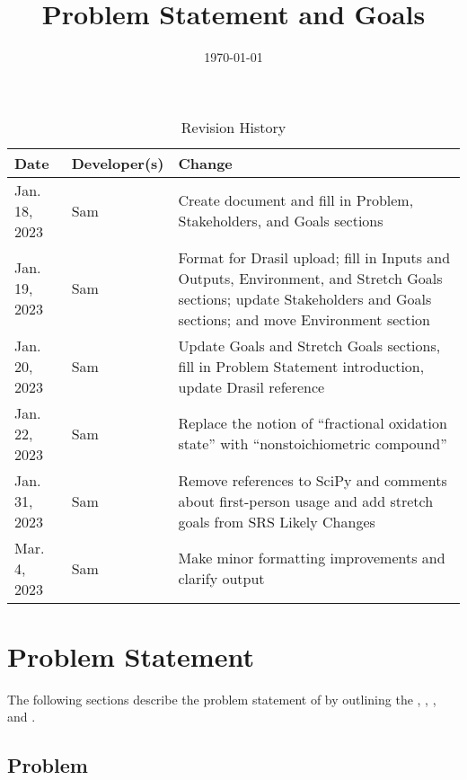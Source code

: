 \documentclass{article}
\title{Problem Statement and Goals\\\progname}
\author{\authname}
\date{\today}
\begin{document}
\maketitle

\begin{table}[hp]
	\caption{Revision History} \label{TblRevisionHistory}
	\begin{tabularx}{\textwidth}{llX}
		\toprule
		\textbf{Date} & \textbf{Developer(s)} & \textbf{Change}              \\
		\midrule
		Jan. 18, 2023 & Sam                   & Create document and fill in
		Problem, Stakeholders, and Goals sections                            \\
		Jan. 19, 2023 & Sam                   & Format for Drasil upload;
		fill in Inputs and Outputs, Environment, and Stretch Goals sections;
		update Stakeholders and Goals sections; and move Environment section \\
		Jan. 20, 2023 & Sam                   & Update Goals and Stretch
		Goals sections, fill in Problem Statement introduction, update
		Drasil reference                                                     \\
		Jan. 22, 2023 & Sam                   & Replace the notion of
		``fractional oxidation state'' with ``nonstoichiometric compound''   \\
		Jan. 31, 2023 & Sam                   & Remove references to SciPy
		and comments about first-person usage and add stretch goals from SRS
		Likely Changes                                                       \\
		Mar. 4, 2023  & Sam                   & Make minor formatting
		improvements and clarify output                                      \\
		\bottomrule
	\end{tabularx}
\end{table}

\section{Problem Statement}

The following sections describe the problem statement of \progname{}
by outlining the , , , and
.

\subsection{Problem} \label{prob}
\end{document}

